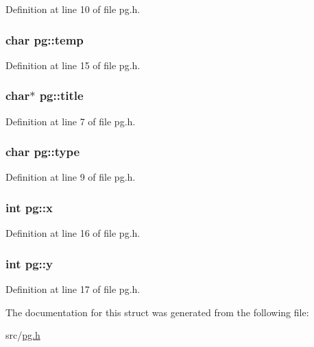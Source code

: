 Definition at line 10 of file pg.\-h.

\hypertarget{structpg_a7febad91bca295daef0bfe2a51b7cdd4}{
\subsubsection[{temp}]{\setlength{\rightskip}{0pt plus 5cm}char pg\-::temp}}\label{structpg_a7febad91bca295daef0bfe2a51b7cdd4}


Definition at line 15 of file pg.\-h.

\hypertarget{structpg_a405000c411bc2e7a549613d36c390bb3}{
\subsubsection[{title}]{\setlength{\rightskip}{0pt plus 5cm}char$\ast$ pg\-::title}}\label{structpg_a405000c411bc2e7a549613d36c390bb3}


Definition at line 7 of file pg.\-h.

\hypertarget{structpg_a96e9a877e6de161590f9353c722766e7}{
\subsubsection[{type}]{\setlength{\rightskip}{0pt plus 5cm}char pg\-::type}}\label{structpg_a96e9a877e6de161590f9353c722766e7}


Definition at line 9 of file pg.\-h.

\hypertarget{structpg_ac12975fdeabe97e5171ea39edb57c4e7}{
\subsubsection[{x}]{\setlength{\rightskip}{0pt plus 5cm}int pg\-::x}}\label{structpg_ac12975fdeabe97e5171ea39edb57c4e7}


Definition at line 16 of file pg.\-h.

\hypertarget{structpg_ae989f1228cbfc5e45dc4d10705b5484e}{
\subsubsection[{y}]{\setlength{\rightskip}{0pt plus 5cm}int pg\-::y}}\label{structpg_ae989f1228cbfc5e45dc4d10705b5484e}


Definition at line 17 of file pg.\-h.



The documentation for this struct was generated from the following file\-:\begin{DoxyCompactItemize}
\item 
src/\hyperlink{pg_8h}{pg.\-h}\end{DoxyCompactItemize}
